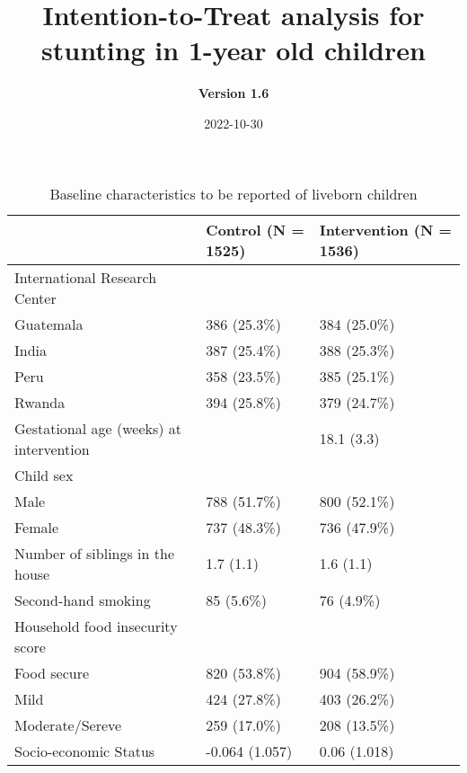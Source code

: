 \documentclass[
]{article}
\title{\textbf{Intention-to-Treat analysis for stunting in 1-year old
children}}
\subtitle{\textbf{Version 1.6}}
\author{}
\date{\vspace{-2.5em}2022-10-30}
\begin{document}
\maketitle

{
\setcounter{tocdepth}{2}
\tableofcontents
}
\begin{table}[H]

\caption{\label{tab:unnamed-chunk-3}Baseline characteristics to be reported of liveborn children}
\centering
\begin{tabular}[t]{l|l|l}
\hline
  & Control (N = 1525) & Intervention (N = 1536)\\
\hline
International Research Center &  & \\
\hline
\hspace{1em}Guatemala & 386 (25.3\%) & 384 (25.0\%)\\
\hline
\hspace{1em}India & 387 (25.4\%) & 388 (25.3\%)\\
\hline
\hspace{1em}Peru & 358 (23.5\%) & 385 (25.1\%)\\
\hline
\hspace{1em}Rwanda & 394 (25.8\%) & 379 (24.7\%)\\
\hline
Gestational age (weeks) at intervention &  & 18.1 (3.3)\\
\hline
Child sex &  & \\
\hline
\hspace{1em}Male & 788 (51.7\%) & 800 (52.1\%)\\
\hline
\hspace{1em}Female & 737 (48.3\%) & 736 (47.9\%)\\
\hline
Number of siblings in the house & 1.7 (1.1) & 1.6 (1.1)\\
\hline
Second-hand smoking & 85  (5.6\%) & 76  (4.9\%)\\
\hline
Household food insecurity score &  & \\
\hline
\hspace{1em}Food secure & 820 (53.8\%) & 904 (58.9\%)\\
\hline
\hspace{1em}Mild & 424 (27.8\%) & 403 (26.2\%)\\
\hline
\hspace{1em}Moderate/Sereve & 259 (17.0\%) & 208 (13.5\%)\\
\hline
Socio-economic Status & -0.064 (1.057) & 0.06 (1.018)\\
\hline
\end{tabular}
\end{table}
\end{document}

